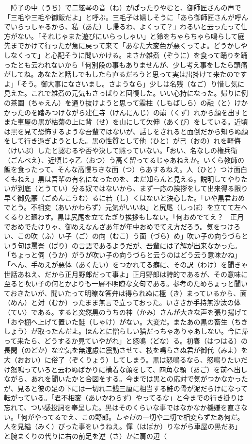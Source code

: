 　障子の中（うち）で二絃琴の音（ね）がぱったりやむと、御師匠さんの声で「三毛や三毛や御飯だよ」と呼ぶ。三毛子は嬉しそうに「あら御師匠さんが呼んでいらっしゃるから、私（あた）し帰るわ、よくって？」わるいと云ったって仕方がない。「それじゃまた遊びにいらっしゃい」と鈴をちゃらちゃら鳴らして庭先までかけて行ったが急に戻って来て「あなた大変色が悪くってよ。どうかしやしなくって」と心配そうに問いかける。まさか雑煮（ぞうに）を食って踊りを踊ったとも云われないから「何別段の事もありませんが、少し考え事をしたら頭痛がしてね。あなたと話しでもしたら直るだろうと思って実は出掛けて来たのですよ」「そう。御大事になさいまし。さようなら」少しは名残（なご）り惜し気に見えた。これで雑煮の元気もさっぱりと回復した。いい心持になった。帰りに例の茶園（ちゃえん）を通り抜けようと思って霜柱（しもばしら）の融（と）けかかったのを踏みつけながら建仁寺（けんにんじ）の崩（くず）れから顔を出すとまた車屋の黒が枯菊の上に背（せ）を山にして欠伸（あくび）をしている。近頃は黒を見て恐怖するような吾輩ではないが、話しをされると面倒だから知らぬ顔をして行き過ぎようとした。黒の性質として他（ひと）が己（おの）れを軽侮（けいぶ）したと認むるや否や決して黙っていない。「おい、名なしの権兵衛（ごんべえ）、近頃じゃ乙（おつ）う高く留ってるじゃあねえか。いくら教師の飯を食ったって、そんな高慢ちきな面（つ）らあするねえ。人（ひと）つけ面白くもねえ」黒は吾輩の有名になったのを、まだ知らんと見える。説明してやりたいが到底（とうてい）分る奴ではないから、まず一応の挨拶をして出来得る限り早く御免蒙（ごめんこうむ）るに若（し）くはないと決心した。「いや黒君おめでとう。不相変（あいかわらず）元気がいいね」と尻尾（しっぽ）を立てて左へくるりと廻わす。黒は尻尾を立てたぎり挨拶もしない。「何おめでてえ？　正月でおめでたけりゃ、御めえなんざあ年が年中おめでてえ方だろう。気をつけろい、この吹（ふ）い子（ご）の向（むこ）う面（づら）め」吹い子の向うづらという句は罵詈（ばり）の言語であるようだが、吾輩には了解が出来なかった。「ちょっと伺（うか）がうが吹い子の向うづらと云うのはどう云う意味かね」「へん、手めえが悪体（あくたい）をつかれてる癖に、その訳（わけ）を聞きゃ世話あねえ、だから正月野郎だって事よ」正月野郎は詩的であるが、その意味に至ると吹い子の何とかよりも一層不明瞭な文句である。参考のためちょっと聞いておきたいが、聞いたって明瞭な答弁は得られぬに極（き）まっているから、面（めん）と対（むか）ったまま無言で立っておった。いささか手持無沙汰の体（てい）である。すると突然黒のうちの神（かみ）さんが大きな声を張り揚げて「おや棚へ上げて置いた鮭（しゃけ）がない。大変だ。またあの黒の畜生（ちきしょう）が取ったんだよ。ほんとに憎らしい猫だっちゃありゃあしない。今に帰って来たら、どうするか見ていやがれ」と怒鳴（どな）る。初春（はつはる）の長閑（のどか）な空気を無遠慮に震動させて、枝を鳴らさぬ君が御代（みよ）を大（おおい）に俗了（ぞくりょう）してしまう。黒は怒鳴るなら、怒鳴りたいだけ怒鳴っていろと云わぬばかりに横着な顔をして、四角な顋（あご）を前へ出しながら、あれを聞いたかと合図をする。今までは黒との応対で気がつかなかったが、見ると彼の足の下には一切れ二銭三厘に相当する鮭の骨が泥だらけになって転がっている。「君不相変（あいかわらず）やってるな」と今までの行き掛りは忘れて、つい感投詞を奉呈した。黒はそのくらいな事ではなかなか機嫌を直さない。「何がやってるでえ、この野郎。\emph{しゃけ}の一切や二切で相変らずたあ何だ。人を見縊（みく）びった事をいうねえ。憚（はばか）りながら車屋の黒だあ」と腕まくりの代りに右の前足を逆（さ）かに肩の辺（